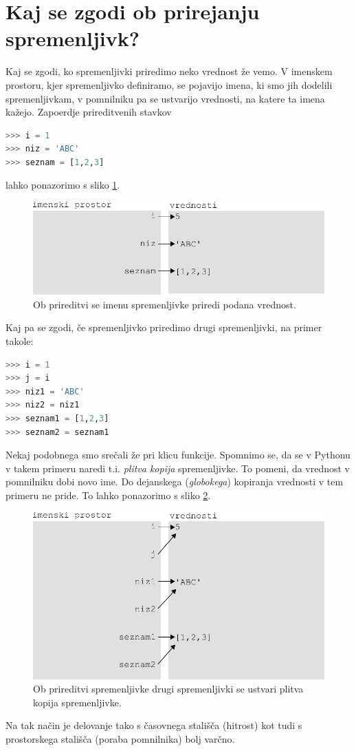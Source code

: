 \section{Kaj se zgodi ob prirejanju spremenljivk?}
Kaj se zgodi, ko spremenljivki priredimo neko vrednost že vemo. V imenskem prostoru, kjer spremenljivko definiramo, se pojavijo imena, ki smo jih dodelili spremenljivkam, v pomnilniku pa se ustvarijo vrednosti, na katere ta imena kažejo. Zapoerdje prireditvenih stavkov
\begin{lstlisting}[language=Python, showstringspaces=false]
>>> i = 1
>>> niz = 'ABC'
>>> seznam = [1,2,3]
\end{lstlisting}
lahko ponazorimo s sliko \ref{img:spremenljivost}.
\begin{figure}
    \centering
    \includegraphics[width=\linewidth]{img/spremenljivost.pdf}
    \caption{Ob prireditvi se imenu spremenljivke priredi podana vrednost.}
    \label{img:spremenljivost}
\end{figure}
Kaj pa se zgodi, če spremenljivko priredimo drugi spremenljivki, na primer takole:
\begin{lstlisting}[language=Python, showstringspaces=false]
>>> i = 1
>>> j = i
>>> niz1 = 'ABC'
>>> niz2 = niz1
>>> seznam1 = [1,2,3]
>>> seznam2 = seznam1
\end{lstlisting}
Nekaj podobnega smo srečali že pri klicu funkcije. Spomnimo se, da se v Pythonu v takem primeru naredi t.i. \textit{plitva kopija} spremenljivke. To pomeni, da vrednost v pomnilniku dobi novo ime. Do dejanskega (\textit{globokega}) kopiranja vrednosti v tem primeru ne pride. To lahko ponazorimo s sliko \ref{img:spremenljivost_2}.
\begin{figure}
    \centering
    \includegraphics[width=\linewidth]{img/spremenljivost_2.pdf}
    \caption{Ob prireditvi spremenljivke drugi spremenljivki se ustvari plitva kopija spremenljivke.}
    \label{img:spremenljivost_2}
\end{figure}
Na tak način je delovanje tako s časovnega stališča (hitrost) kot tudi s prostorskega stališča (poraba pomnilnika) bolj varčno. 

